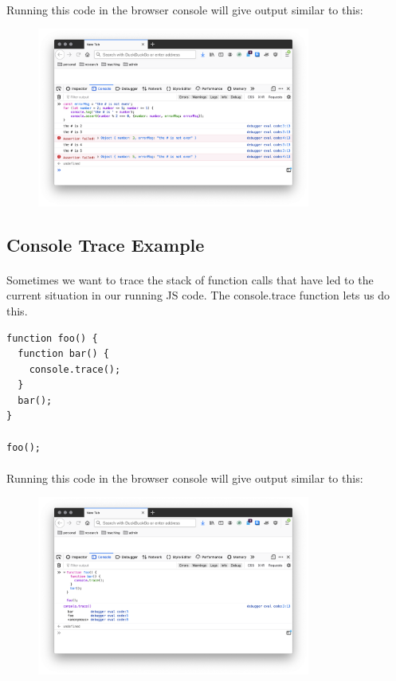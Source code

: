 \paragraph{} Running this code in the browser console will give output similar to this:

\begin{figure}[H]
\centering
\includegraphics[width=0.8\textwidth]{figures/console-assert}
\label{fig:console-assert}
\caption{}
\end{figure}


\subsection{Console Trace Example}
\paragraph{} Sometimes we want to trace the stack of function calls that have led to the current situation in our running JS code. The console.trace function lets us do this.

\begin{lstlisting}
function foo() {
  function bar() {
    console.trace();
  }
  bar();
}

foo();
\end{lstlisting}

\paragraph{} Running this code in the browser console will give output similar to this:

\begin{figure}[H]
\centering
\includegraphics[width=0.8\textwidth]{figures/console-trace}
\label{fig:console-trace}
\caption{}
\end{figure}


